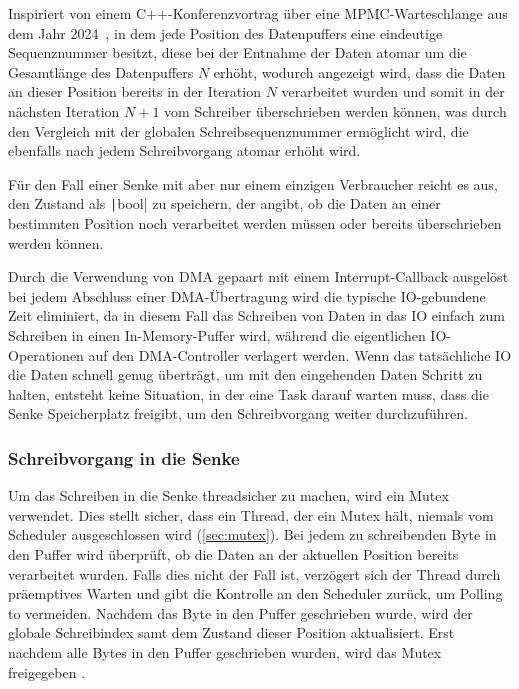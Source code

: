 Inspiriert von einem C++-Konferenzvortrag über eine \ac{MPMC}-Warteschlange aus
dem Jahr 2024~\cite{CppCon2024LockFreeQueue}, in dem jede Position des
Datenpuffers eine eindeutige Sequenznummer besitzt, diese bei der Entnahme der
Daten atomar um die Gesamtlänge des Datenpuffers $N$ erhöht, wodurch angezeigt
wird, dass die Daten an dieser Position bereits in der Iteration $N$ verarbeitet
wurden und somit in der nächsten Iteration $N + 1$ vom Schreiber überschrieben
werden können, was durch den Vergleich mit der globalen Schreibsequenznummer
ermöglicht wird, die ebenfalls nach jedem Schreibvorgang atomar erhöht wird.

Für den Fall einer Senke mit aber nur einem einzigen Verbraucher reicht es aus,
den Zustand als \texttt|bool| zu speichern, der angibt, ob die Daten an
einer bestimmten Position noch verarbeitet werden müssen oder bereits
überschrieben werden können.

Durch die Verwendung von DMA gepaart mit einem Interrupt-Callback ausgelöst bei
jedem Abschluss einer DMA-Übertragung wird die typische IO-gebundene Zeit
eliminiert, da in diesem Fall das Schreiben von Daten in das IO einfach zum
Schreiben in einen In-Memory-Puffer wird, während die eigentlichen
IO-Operationen auf den DMA-Controller verlagert werden. Wenn das tatsächliche IO
die Daten schnell genug überträgt, um mit den eingehenden Daten Schritt zu
halten, entsteht keine Situation, in der eine Task darauf warten muss, dass die
Senke Speicherplatz freigibt, um den Schreibvorgang weiter durchzuführen.

\subsubsection{Schreibvorgang in die Senke}

Um das Schreiben in die Senke threadsicher zu machen, wird ein Mutex verwendet.
Dies stellt sicher, dass ein Thread, der ein Mutex hält, niemals vom Scheduler
ausgeschlossen wird (\ref{sec:mutex}). Bei jedem zu schreibenden Byte in den
Puffer wird überprüft, ob die Daten an der aktuellen Position bereits
verarbeitet wurden. Falls dies nicht der Fall ist, verzögert sich der Thread
durch präemptives Warten und gibt die Kontrolle an den Scheduler zurück, um
Polling to vermeiden. Nachdem das Byte in den Puffer geschrieben wurde, wird der
globale Schreibindex samt dem Zustand dieser Position aktualisiert. Erst nachdem
alle Bytes in den Puffer geschrieben wurden, wird das Mutex freigegeben
\cite{FreeRTOSForumPrintf}.

